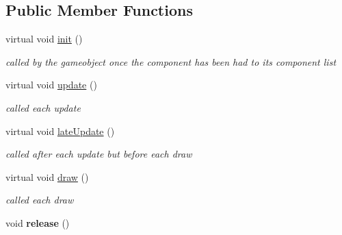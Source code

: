 \subsection*{\-Public \-Member \-Functions}
\begin{DoxyCompactItemize}
\item 
\hypertarget{classde_1_1_a_component_a7ab24a42d85ff99b43e48b65f632945e}{
virtual void \hyperlink{classde_1_1_a_component_a7ab24a42d85ff99b43e48b65f632945e}{init} ()}
\label{classde_1_1_a_component_a7ab24a42d85ff99b43e48b65f632945e}

\begin{DoxyCompactList}\small\item\em called by the gameobject once the component has been had to its component list \end{DoxyCompactList}\item 
\hypertarget{classde_1_1_a_component_a21411259fcb39ed538cb4c0a2f48d0bd}{
virtual void \hyperlink{classde_1_1_a_component_a21411259fcb39ed538cb4c0a2f48d0bd}{update} ()}
\label{classde_1_1_a_component_a21411259fcb39ed538cb4c0a2f48d0bd}

\begin{DoxyCompactList}\small\item\em called each update \end{DoxyCompactList}\item 
\hypertarget{classde_1_1_a_component_a2f7e56f9d37db6cffff0aa3b5f86e346}{
virtual void \hyperlink{classde_1_1_a_component_a2f7e56f9d37db6cffff0aa3b5f86e346}{late\-Update} ()}
\label{classde_1_1_a_component_a2f7e56f9d37db6cffff0aa3b5f86e346}

\begin{DoxyCompactList}\small\item\em called after each update but before each draw \end{DoxyCompactList}\item 
\hypertarget{classde_1_1_a_component_ad1657f2e375354e70b94bbe86fae721b}{
virtual void \hyperlink{classde_1_1_a_component_ad1657f2e375354e70b94bbe86fae721b}{draw} ()}
\label{classde_1_1_a_component_ad1657f2e375354e70b94bbe86fae721b}

\begin{DoxyCompactList}\small\item\em called each draw \end{DoxyCompactList}\item 
\hypertarget{classde_1_1_a_component_a02ecbe18d2fa3449b66a59656a1040d5}{
void {\bfseries release} ()}
\label{classde_1_1_a_component_a02ecbe18d2fa3449b66a59656a1040d5}

\end{DoxyCompactItemize}
